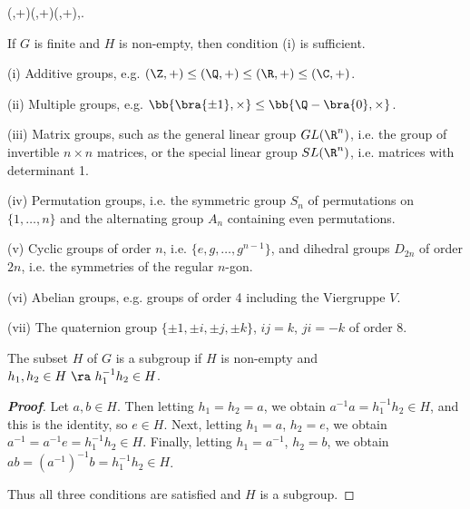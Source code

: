 \begin{example}
\be
(\Z,+)\leq (\Q,+)\leq (\R,+),\quad\quad {}\leq {}.
\ee
\end{example}

\begin{remark}
If $G$ is finite and $H$ is non-empty, then condition (i) is sufficient.
\end{remark}

\begin{example}
\ben
\item [(i)] Additive groups, e.g. $(\Z, +)\leq (\Q,+) \leq (\R, +) \leq (\C, +)$.
\item [(ii)] Multiple groups, e.g. $\bb{\bra{\pm 1},\times}\leq \bb{\Q-\bra{0},\times}$.
\item [(iii)] Matrix groups, such as the general linear group $GL(\R^n)$, i.e. the group of invertible $n\times n$ matrices, or the special linear group $SL(\R^n)$, i.e. matrices with determinant 1.
\item [(iv)] Permutation groups, i.e. the symmetric group $S_n$ of permutations on $\{1,\dots , n\}$ and the alternating group $A_n$ containing even permutations.
\item [(v)] Cyclic groups of order $n$, i.e. $\{e, g,\dots , g^{n-1}\}$, and dihedral groups $D_{2n}$ of order $2n$, i.e. the symmetries of the regular $n$-gon.
\item [(vi)] Abelian groups, e.g. groups of order 4 including the Viergruppe $V$.
\item [(vii)] The quaternion group $\{\pm 1,\pm i,\pm j,\pm k\}$, $ij = k$, $ji = -k$ of order 8.
\een
\end{example}




\begin{lemma}\label{lem:subgroup}
The subset $H$ of $G$ is a subgroup if $H$ is non-empty and $h_1,h_2\in H\ \ra\ h_1^{-1}h_2 \in H$.
\end{lemma}

\begin{proof}[\bf Proof]
Let $a,b\in H$. Then letting $h_1=h_2=a$, we obtain $a^{-1}a = h_1^{-1}h_2 \in H$, and this is the identity, so $e\in H$. Next, letting $h_1=a$, $h_2=e$, we obtain $a^{-1} = a^{-1}e = h_1^{-1}h_2 \in H$. Finally, letting $h_1=a^{-1}$, $h_2=b$, we obtain $ab = (a^{-1})^{-1}b = h_1^{-1}h_2\in H$.

Thus all three conditions are satisfied and $H$ is a subgroup.
\end{proof}

